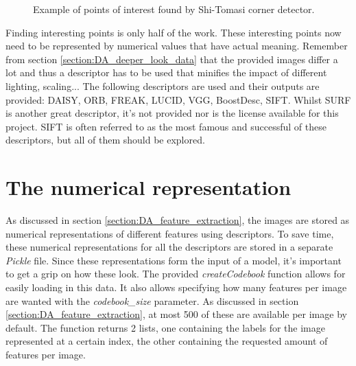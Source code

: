 \begin{figure}[H]
    \centering
    \captionsetup{width=0.7\linewidth}
    \captionsetup{justification=centering}
    \caption{Example of points of interest found by Shi-Tomasi corner detector.}
    \label{fig:1-data_analysis-POI}
\end{figure}

Finding interesting points is only half of the work.
These interesting points now need to be represented by numerical values that have actual meaning.
Remember from section \ref{section:DA_deeper_look_data} that the provided images differ a lot and thus a descriptor has to be used that minifies the impact of different lighting, scaling...
The following descriptors are used and their outputs are provided: DAISY, ORB, FREAK, LUCID, VGG, BoostDesc, SIFT.
Whilst SURF is another great descriptor, it's not provided nor is the license available for this project.
SIFT is often referred to as the most famous and successful of these descriptors, but all of them should be explored.



\section{The numerical representation}
\label{section:DA_numerical_representation}

As discussed in section \ref{section:DA_feature_extraction}, the images are stored as numerical representations of different features using descriptors.
To save time, these numerical representations for all the descriptors are stored in a separate \emph{Pickle} file.
Since these representations form the input of a model, it's important to get a grip on how these look.
The provided \emph{createCodebook} function allows for easily loading in this data.
It also allows specifying how many features per image are wanted with the \emph{codebook\_size} parameter.
As discussed in section \ref{section:DA_feature_extraction}, at most 500 of these are available per image by default.
The function returns 2 lists, one containing the labels for the image represented at a certain index, the other containing the requested amount of features per image. 

